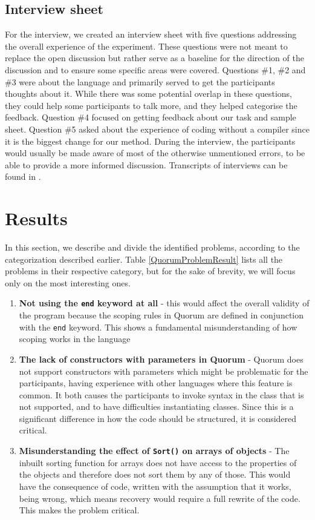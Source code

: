 \documentclass[preprint,10pt]{sigplanconf}
\begin{document}
\subsection{Interview sheet}
For the interview, we created an interview sheet with five questions addressing the overall experience of the experiment.
These questions were not meant to replace the open discussion but rather serve as a baseline for the direction of the discussion and to ensure some specific areas were covered.
Questions \#1, \#2 and \#3 were about the language and primarily served to get the participants thoughts about it.
While there was some potential overlap in these questions, they could help some participants to talk more, and they helped categorise the feedback.
Question \#4 focused on getting feedback about our task and sample sheet.
Question \#5 asked about the experience of coding without a compiler since it is the biggest change for our method.
During the interview, the participants would usually be made aware of most of the otherwise unmentioned errors, to be able to provide a more informed discussion.
Transcripts of interviews can be found in \cite{thesis}.

\section{Results}
In this section, we describe and divide the identified problems, according to the categorization described earlier. Table \ref{QuorumProblemResult} lists all the problems in their respective category, but for the sake of brevity, we will focus only on the most interesting ones. 

\begin{enumerate}
\item \textbf{Not using the \lstinline!end! keyword at all} - this would affect the overall validity of the program because the scoping rules in Quorum are defined in conjunction with the \lstinline!end! keyword. This shows a fundamental misunderstanding of how scoping works in the language
\item \textbf{The lack of constructors with parameters in Quorum} - Quorum does not support constructors with parameters which might be problematic for the participants, having experience with other languages where this feature is common. It both causes the participants to invoke syntax in the class that is not supported, and to have difficulties instantiating classes. Since this is a significant difference in how the code should be structured, it is considered critical.
\item \textbf{Misunderstanding the effect of \lstinline!Sort()! on arrays of objects} - The inbuilt sorting function for arrays does not have access to the properties of the objects and therefore does not sort them by any of those. This would have the consequence of code, written with the assumption that it works, being wrong, which means recovery would require a full rewrite of the code. This makes the problem critical. 
\end{enumerate}
\end{document}
